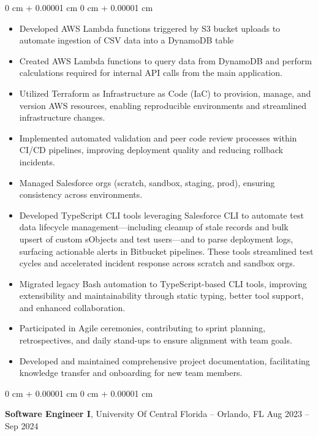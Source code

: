 \documentclass[10pt, letterpaper]{article}
\newenvironment{highlights}{
    \begin{itemize}[
        topsep=0.10 cm,
        parsep=0.10 cm,
        partopsep=0pt,
        itemsep=0pt,
        leftmargin=0 cm + 10pt
    ]
}{
    \end{itemize}
} %
\newenvironment{onecolentry}{
    \begin{adjustwidth}{
        0 cm + 0.00001 cm
    }{
        0 cm + 0.00001 cm
    }
}{
    \end{adjustwidth}
} %
\newenvironment{twocolentry}[2][]{
    \onecolentry
    \def\secondColumn{#2}
    \setcolumnwidth{\fill, 4.5 cm}
    \begin{paracol}{2}
}{
    \switchcolumn \raggedleft \secondColumn
    \end{paracol}
    \endonecolentry
} %
\begin{document}
\vspace{0.10 cm}
\begin{onecolentry}
	\begin{highlights}
		\item Developed AWS Lambda functions triggered by S3 bucket uploads to automate
		ingestion of CSV data into a DynamoDB table
		\item Created AWS Lambda functions to query data from DynamoDB and perform calculations required for internal API calls from the main application.
		\item Utilized Terraform as Infrastructure as Code (IaC) to provision, manage, and version AWS resources, enabling reproducible environments and streamlined infrastructure changes.
		\item Implemented automated validation and peer code review processes within
		CI/CD pipelines, improving deployment quality and reducing rollback
		incidents.
		\item Managed Salesforce orgs (scratch, sandbox, staging, prod), ensuring
		consistency across environments.
		\item Developed TypeScript CLI tools leveraging Salesforce CLI to automate test data lifecycle management—including cleanup of stale records and bulk upsert of custom sObjects and test users—and to parse deployment logs, surfacing actionable alerts in Bitbucket pipelines. These tools streamlined test cycles and accelerated incident response across scratch and sandbox orgs.
		\item Migrated legacy Bash automation to TypeScript-based CLI tools, improving
		extensibility and maintainability through static typing, better tool support,
		and enhanced collaboration.
		\item Participated in Agile ceremonies, contributing to sprint planning,
		retrospectives, and daily stand-ups to ensure alignment with team goals.
		\item Developed and maintained comprehensive project documentation, facilitating knowledge transfer and onboarding for new team members.
	\end{highlights}
\end{onecolentry}


\vspace{0.2 cm}

\begin{twocolentry}{
		Aug 2023 – Sep 2024
	}
	\textbf{Software Engineer I}, University Of Central Florida -- Orlando, FL\end{twocolentry}
\end{document}
